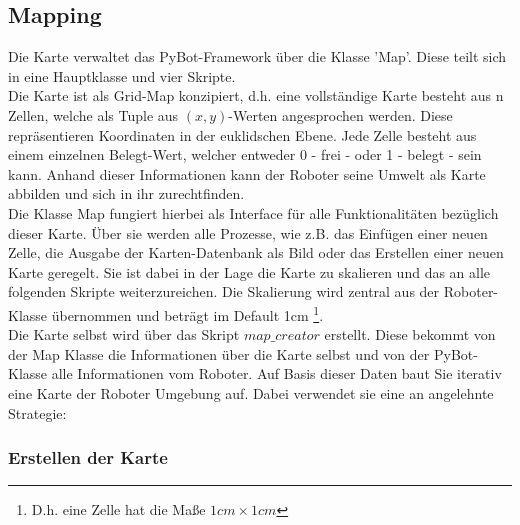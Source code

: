\documentclass[twoside,11pt, a4paper]{report}
\begin{document}
	\subsection{Mapping}
	Die Karte verwaltet das PyBot-Framework über die Klasse 'Map'. Diese teilt sich in eine Hauptklasse und vier Skripte.\\
	Die Karte ist als Grid-Map konzipiert, d.h. eine vollständige Karte besteht aus n Zellen, welche als Tuple aus $(x,y)$-Werten angesprochen werden. Diese repräsentieren Koordinaten in der euklidschen Ebene. Jede Zelle besteht aus einem einzelnen Belegt-Wert, welcher entweder 0 - frei - oder 1 - belegt - sein kann. Anhand dieser Informationen kann der Roboter seine Umwelt als Karte abbilden und sich in ihr zurechtfinden. \\
	Die Klasse Map fungiert hierbei als Interface für alle Funktionalitäten bezüglich dieser Karte. Über sie werden alle Prozesse, wie z.B. das Einfügen einer neuen Zelle, die Ausgabe der Karten-Datenbank als Bild oder das Erstellen einer neuen Karte geregelt. Sie ist dabei in der Lage die Karte zu skalieren und das an alle folgenden Skripte weiterzureichen. Die Skalierung wird zentral aus der Roboter-Klasse übernommen und beträgt im Default 1cm \footnote{D.h. eine Zelle hat die Maße $1cm \times 1cm$}.\\
	Die Karte selbst wird über das Skript $map\_creator $ erstellt. Diese bekommt von der Map Klasse die Informationen über die Karte selbst und von der PyBot-Klasse alle Informationen vom Roboter. Auf Basis dieser Daten baut Sie iterativ eine Karte der Roboter Umgebung auf. Dabei verwendet sie eine an \cite{Hofmeister} angelehnte Strategie: 
	
	\subsubsection{Erstellen der Karte}
	
\end{document}
